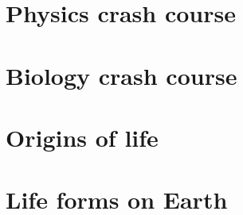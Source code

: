 \documentclass[DIV=calc, paper=a4, fontsize=12pt]{scrartcl}	 %
\begin{document}

\pagebreak

\section{Physics crash course}

\begin{multicols}{2}









\end{multicols}

\noindent\makebox[\linewidth]{\rule{\textwidth}{0.4pt}}


\section{Biology crash course}

\begin{multicols}{2}



\end{multicols}


\section{Origins of life}

\begin{multicols}{2}



\end{multicols}

\pagebreak

\section{Life forms on Earth}
\end{document}
